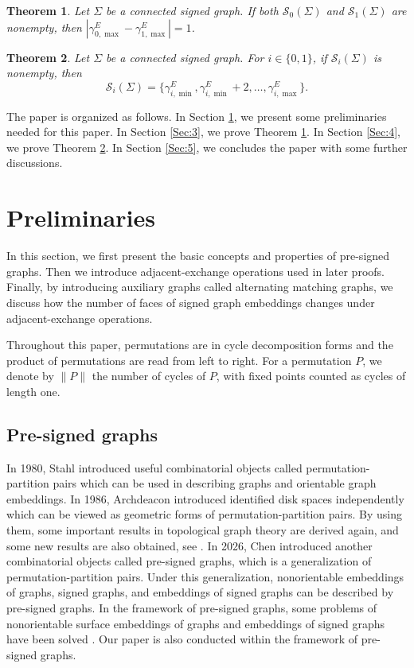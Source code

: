 \documentclass[10pt,a4paper]{amsart}
\newtheorem{theorem}{Theorem}[section]
\newcommand{\cS}{\mathcal S}
\begin{document}
\begin{theorem}\label{t1:3}
Let $\Sigma$ be a connected  signed graph. If both $\cS_0(\Sigma)$ and $\cS_1(\Sigma)$ are nonempty, then $\left|\gamma_{0,\max}^E-\gamma_{1,\max}^E\right|=1$.
\end{theorem}


\begin{theorem}\label{t1:4}
Let $\Sigma$ be a connected  signed graph. For $i\in\{0,1\}$, if $\cS_i(\Sigma)$ is nonempty, then
$$\cS_i(\Sigma)=\{\gamma_{i,\min}^E,\gamma_{i,\min}^E+2,\ldots,\gamma_{i,\max}^E\}.$$
\end{theorem}


The paper is organized as follows. In Section \ref{Sec:2}, we present some preliminaries needed for this paper.
In Section \ref{Sec:3}, we prove Theorem \ref{t1:3}.
In Section \ref{Sec:4}, we prove Theorem \ref{t1:4}. In Section \ref{Sec:5}, we concludes the paper with some further discussions.

\section{Preliminaries}\label{Sec:2}
In this section, we first present the basic concepts and properties of pre-signed graphs. Then we introduce adjacent-exchange operations used in later proofs. Finally, by introducing auxiliary graphs called alternating matching graphs, we discuss how the number of faces of signed graph embeddings changes under adjacent-exchange operations.

Throughout this paper, permutations are in cycle decomposition forms and the
product of permutations are read from left to right. For a permutation $P$, we denote by $\lVert P\rVert$ the number of cycles of $P$, with fixed points counted as cycles of length one.

\subsection{Pre-signed graphs}
In 1980, Stahl \cite{Stahl1980} introduced useful combinatorial objects called permutation-partition pairs which can be used in describing  graphs and orientable graph embeddings. In 1986, Archdeacon \cite{Archdeacon86-1,Archdeacon86-2} introduced identified disk spaces independently which can be viewed as geometric forms of permutation-partition pairs. By using them, some important results in topological graph theory are derived again, and some new results are also obtained, see \cite{Archdeacon86-1,Archdeacon86-2,Archdeacon98,Bonnington94-1,Bonnington94-2,Stahl1980,Stahl1982,Stahl1983,Stahl1988,Stahl1991}. In 2026, Chen \cite{Chen2026PreSigned} introduced another combinatorial objects called pre-signed graphs, which is a generalization of permutation-partition pairs. Under this generalization, nonorientable embeddings of graphs, signed graphs, and embeddings of signed graphs can be described by pre-signed graphs. In the framework of pre-signed graphs, some problems of nonorientable surface embeddings of graphs and embeddings of signed graphs have been solved \cite{Chen2026PreSigned,Chen2026PreSigned01}.
Our paper is also conducted within the framework of pre-signed graphs.
\end{document}

